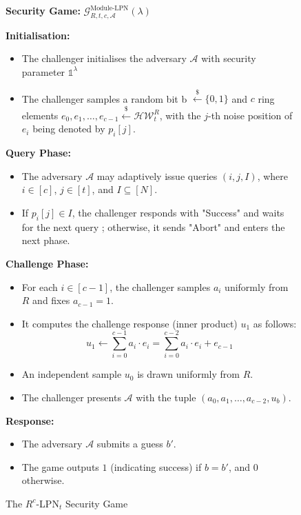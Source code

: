 \begin{figure}[t]
    \begin{mdframed}[nobreak=true]
        \begin{center}
            \textbf{Security Game:} $\mathcal{G}_{R, t, c,\mathcal{A}}^{\text{Module-LPN}}(\lambda)$\\
        \end{center}

        \textbf{Initialisation:}
        \begin{itemize}
            \item The challenger initialises the adversary $\mathcal{A}$ with security parameter $\mathds{1}^{\lambda}$ 
            \item The challenger samples a random bit b $\stackrel{\$}{\leftarrow} \{0,1\}$ and $c$ ring elements $e_{0}, e_{1}, \ldots, e_{c-1} \stackrel{\$}{\leftarrow} \mathcal{H} \mathcal{W}_{t}^{R}$, with the $j$-th noise position of $e_i$ being denoted by $p_{i}[j]$.
        \end{itemize}
        
        \textbf{Query Phase:}
        \begin{itemize}
            \item The adversary $\mathcal{A}$ may adaptively issue queries $(i, j, I)$, where $i \in [c]$, $j \in [t]$, and $I \subseteq [N]$.
            \item If $p_{i}[j] \in I$, the challenger responds with "Success" and waits for the next query ; otherwise, it sends "Abort" and enters the next phase.
        \end{itemize}

        \textbf{Challenge Phase:}
        \begin{itemize}
            \item For each $i \in [c-1]$, the challenger samples $a_{i}$ uniformly from $R$ and fixes $a_{c-1} = 1$.
            \item It computes the challenge response (inner product) $u_{1}$ as follows:
            $$
            u_{1} \leftarrow \sum_{i=0}^{c-1} a_{i} \cdot e_{i} = \sum_{i=0}^{c-2} a_{i} \cdot e_{i} + e_{c-1}
            $$
            \item An independent sample $u_{0}$ is drawn uniformly from $R$.
            \item The challenger presents $\mathcal{A}$ with the tuple $\left(a_{0}, a_{1}, \ldots, a_{c-2}, u_{b}\right)$.
        \end{itemize}

        \textbf{Response:}
        \begin{itemize}
            \item The adversary $\mathcal{A}$ submits a guess $b'$.
            \item The game outputs $1$ (indicating success) if $b = b'$, and $0$ otherwise.
        \end{itemize}
    \end{mdframed}
    \caption{The $R^{c}$-LPN$_{t}$ Security Game}
    \label{fig:module-lpn-game}
\end{figure}

